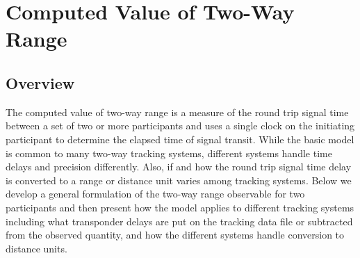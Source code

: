 %

\section{Computed Value of Two-Way Range }

\subsection{Overview}

The computed value of two-way range is a measure of the round trip signal time between a set of two or more participants and uses a single clock on the initiating participant to determine the elapsed time of signal transit.   While the basic model is common to many two-way tracking systems, different systems handle time delays and precision differently.  Also, if and how the round trip signal time delay is converted to a range or distance unit varies among tracking systems.  Below we develop a general formulation of the two-way range observable for two participants and then present how the model applies to different tracking systems including what transponder delays are put on the tracking data file or subtracted from the observed quantity, and how the different systems handle conversion to distance units.

